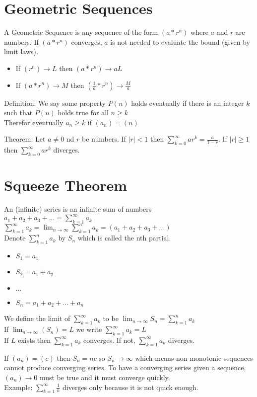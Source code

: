 \documentclass{article}
\begin{document}
\section{Geometric Sequences}
A Geometric Sequence is any sequence of the form $(a * r^n)$ where $a$ and $r$ are numbers. If $(a * r^n)$ converges, $a$ is not needed to evaluate the bound (given by limit laws).
\begin{itemize}
  \item If $(r^n) \to L$ then $(a * r^n) \to aL$
  \item If $(a* r^n) \to M$ then $(\frac{1}{a} * r^n) \to \frac{M}{a}$
\end{itemize}

Definition: We say some property $P(n)$ holds eventually if there is an integer $k$ such that $P(n)$ holds true for all $n \geq k$\\
Therefor eventually $a_n \geq k$ if $(a_n) = (n)$

Theorem: Let $a \neq 0$ nd $r$ be numbers. If $|r| < 1$ then $\sum_{k = 0}^{\infty} ar^k = \frac{a}{1-r}$. If $|r| \geq 1$ then $\sum_{k = 0}^{\infty} ar^k$ diverges.

\section{Squeeze Theorem}
An (infinite) series is an infinite sum of numbers\\
$a_1 + a_2 + a_3 + ... = \sum_{k=1}^{\infty} a_k$\\
$\sum_{k=1}^{\infty} a_k = \lim_{n \to \infty}\sum_{k=1}^{n} a_k = (a_1 + a_2 + a_3 + ...)$\\
Denote $\sum_{k=1}^{n} a_k$ by $S_n$ which is called the nth partial.
\begin{itemize}
  \item $S_1 = a_1$
  \item $S_2 = a_1 + a_2$
  \item $...$
  \item $S_n = a_1 + a_2 + ... + a_n$
\end{itemize}

We define the limit of $\sum_{k=1}^{\infty}a_k$ to be $\lim_{n \to \infty}S_n = \sum_{k=1}^{n}a_k$\\
If $\lim_{n \to \infty}(S_n) = L$ we write $\sum_{k=1}^{\infty}a_k = L$\\
If $L$ exists then $\sum_{k=1}^{\infty} a_k$ converges. If not, $\sum_{k=1}^{\infty}a_k$ diverges.

If $(a_n) = (c)$ then $S_n = nc$ so $S_n \to \infty$ which means non-monotonic sequences cannot produce converging series. To have a converging series given a sequence, $(a_n) \to 0$ must be true and it must converge quickly.\\
Example: $\sum_{k=1}^{\infty}\frac{1}{n}$ diverges only because it is not quick enough.
\end{document}
